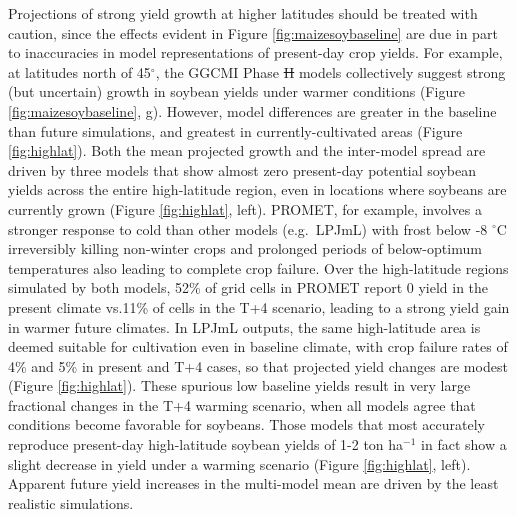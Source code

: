 \documentclass[gmd, manuscript]{copernicus} %
\providecommand{\DIFadd}[1]{{\protect\color{blue}\uwave{#1}}} %
\providecommand{\DIFdel}[1]{{\protect\color{red}\sout{#1}}}                      %
\providecommand{\DIFaddbegin}{} %
\providecommand{\DIFaddend}{} %
\providecommand{\DIFdelbegin}{} %
\providecommand{\DIFdelend}{} %
\begin{document}
Projections of strong yield growth at higher latitudes should be treated with caution, since the effects evident in Figure \ref{fig:maizesoybaseline} are due in part to inaccuracies in model representations of present-day crop yields. 
For example, at latitudes north of 45$^\circ$, the GGCMI Phase \DIFdelbegin \DIFdel{II }\DIFdelend \DIFaddbegin \DIFadd{2 }\DIFaddend models collectively suggest strong (but uncertain) growth in soybean yields under warmer conditions (Figure \ref{fig:maizesoybaseline}, g). 
However, model differences are greater in the baseline than future simulations, and greatest in currently-cultivated areas (Figure \ref{fig:highlat}). 
Both the mean projected growth and the inter-model spread are driven by three models that show almost zero present-day potential soybean yields across the entire high-latitude region, even in locations where soybeans are currently grown (Figure \ref{fig:highlat}, left).
PROMET, for example, involves a stronger response to cold than other models (e.g.\ LPJmL) with frost below -8 $^\circ$C irreversibly killing non-winter crops and prolonged periods of below-optimum temperatures also leading to complete crop failure. 
Over the high-latitude regions simulated by both models, 52\% of grid cells in PROMET report 0 yield in the present climate vs.\DIFaddbegin \DIFadd{\ 
}\DIFaddend 11\% of cells in the T+4 scenario, leading to a strong yield gain in warmer future climates. 
In LPJmL outputs, the same high-latitude area is deemed suitable for cultivation even in baseline climate, with crop failure rates of 4\% and 5\% in present and T+4 cases, so that projected yield changes are modest (Figure \ref{fig:highlat}).
These spurious low baseline yields result in very large fractional changes in the T+4 warming scenario, when all models agree that conditions become favorable for soybeans. 
Those models that most accurately reproduce present-day high-latitude soybean yields of 1-2 ton ha$^{-1}$ \citep{Ray2012} in fact show a slight decrease in yield under a warming scenario (Figure \ref{fig:highlat}, left). 
Apparent future yield increases in the multi-model mean are driven by the least realistic simulations.
\end{document}
